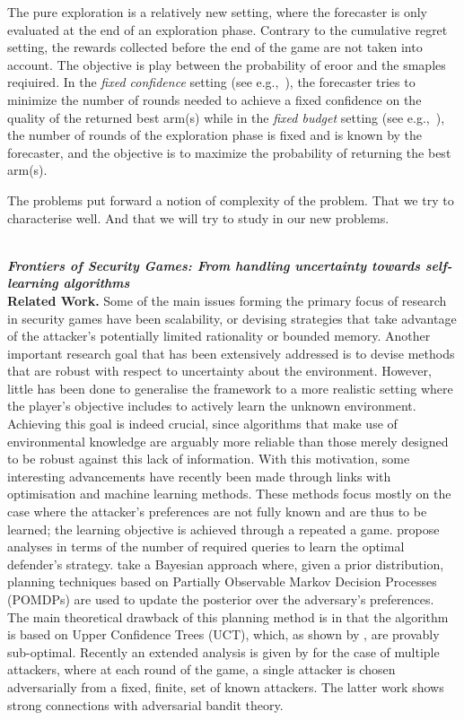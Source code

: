 The pure exploration is a relatively new setting, where the forecaster is only evaluated at the end of an exploration phase. Contrary to the cumulative regret setting, the rewards collected before the end of the game are not taken into account. 
The objective is  play between the probability of eroor and the smaples reqiuired. 
In the \textit{fixed confidence} setting (see e.g.,~\cite{Maron93HR,Even-Dar06AE}), the forecaster tries to minimize the number of rounds needed to achieve a fixed confidence on the quality of the returned best arm(s) while in the \textit{fixed budget} setting (see e.g.,~\cite{Bubeck09PE,Audibert10BA}), the number of rounds of the exploration phase is fixed and is known by the forecaster, and the objective is to maximize the probability of returning the best arm(s). 

The problems put forward a notion of complexity of the problem. That we try to characterise well. And that we will try to study in our new problems.

\noindent \textbf{\textit{\\Frontiers of Security Games: From handling uncertainty towards self-learning algorithms}}\\
\textbf{Related Work.}
Some of the main issues forming the primary focus of research in security games have been scalability, or devising strategies that take advantage of the attacker's potentially limited rationality or bounded memory\cite{tambe2012game}. Another important research goal that has been extensively addressed is to devise methods that are robust with respect to uncertainty about the environment\cite{Nguyen14RO, aghassi2006robust}.
However, little has been done to generalise the framework to a more realistic setting where the player's objective includes to actively learn the unknown environment. Achieving this goal is indeed crucial, since algorithms that make use of environmental knowledge are arguably more reliable than those merely designed to be robust against this lack of information. With this motivation, some interesting advancements have recently been made through links with optimisation and machine learning methods. 
These methods focus mostly on the case where the attacker's preferences are not fully known and are thus to be learned; the learning objective is achieved through a repeated a game.  \cite{blum2014learning, letchford2009learning} propose analyses in terms of the number of required queries to learn the optimal defender's strategy. 
\cite{Marecki12PR, qian2014online} take a Bayesian approach where, given a prior distribution, planning techniques based on Partially Observable Markov Decision Processes (POMDPs) are used to update the posterior over the adversary's preferences.
The main theoretical drawback of this planning method is in that the algorithm is based on Upper Confidence Trees (UCT), which, as shown by  \cite{munos2014bandits}, are provably sub-optimal. 
Recently an extended analysis is given by \cite{Balcan15CR}  for the case of multiple attackers, where at each round of the game, a single attacker is chosen adversarially from a fixed, finite, set of known attackers. The latter work shows strong connections with adversarial bandit theory. 

